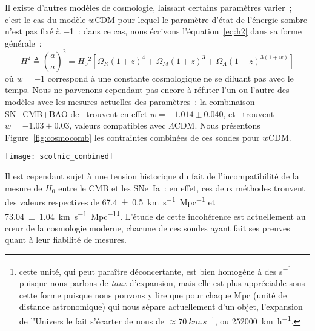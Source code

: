 \documentclass[../main/main.tex]{subfiles}
\begin{document}
Il existe d'autres modèles de cosmologie, laissant certains paramètres varier~;
c'est le cas du modèle $w$CDM pour lequel le paramètre d'état de l'énergie
sombre n'est pas fixé à \num{-1}~: dans ce cas, nous écrivons
l'équation~\ref{eq:h2} dans sa forme générale~:
\begin{equation}\label{eq:h2w}
    H^2 \triangleq \left( \frac{\dot{a}}{a} \right)^2 =
    H_0{}^2 \left[ \Omega_R \left( 1+z \right)^4 +
        \Omega_M \left( 1+z \right)^3 +
    \Omega_\Lambda \left( 1+z \right)^{3(1+w)} \right]
\end{equation}
où $w=-1$ correspond à une constante cosmologique ne se diluant pas avec le
temps. Nous ne parvenons cependant pas encore à réfuter l'un ou l'autre des
modèles avec les mesures actuelles des paramètres~: la combinaison SN+CMB+BAO
de~\cite{scolnic2018} trouvent en effet $w = \num{-1.014}\pm\num{0.040}$,
et~\cite{planck2018} trouvent $w = \num{-1.03}\pm\num{0.03}$, valeurs
compatibles avec $\Lambda$CDM. Nous présentons Figure~\ref{fig:cosmocomb} les
contraintes combinées de ces sondes pour $w$CDM.

\begin{SCfigure}[1][ht]
    \centering
    \texttt{[image: scolnic\_combined]}
    \caption[Contraintes sur les paramètres cosmologiques $w$ et $\Omega_M$ par
    la combinaison SNe~Ia, CMB et BAO]{Contraintes à 68 et 95\% sur les
        paramètres cosmologiques $w$ et $\Omega_M$ par la combinaison SNe~Ia
        (\textit{en rouge}), par le CMB (\textit{en bleu}) fournies par la
        collaboration~\cite{planck2015}. Les contours \textit{jaunes} combinent
        le CMB et le BAO~\citep{alam2015}~; les contours \textit{noirs} le CMB
    et les SNe~Ia. Figure de~\cite{scolnic2018}.}\label{fig:cosmocomb}
\end{SCfigure}

Il est cependant sujet à une tension historique du fait de l'incompatibilité de
la mesure de $H_0$ entre le CMB et les SNe~Ia~: en effet, ces deux méthodes
trouvent des valeurs respectives de \SI{67.4\pm0.5}{km.s^{-1}.Mpc^{-1}} et
\SI{73.04\pm1.04}{km.s^{-1}.Mpc^{-1}}\footnote{cette unité, qui peut paraître
    déconcertante, est bien homogène à des \si{s^{-1}} puisque nous parlons de
    \textit{taux} d'expansion, mais elle est plus appréciable sous cette forme
    puisque nous pouvons y lire que pour chaque \si{Mpc} (unité de distance
    astronomique) qui nous sépare actuellement d'un objet, l'expansion de
    l'Univers le fait s'écarter de nous de $\approx \SI{70}{km.s^{-1}}$, ou
\SI{252000}{km.h^{-1}}.}. L'étude de cette incohérence est actuellement au
cœur de la cosmologie moderne, chacune de ces sondes ayant fait ses preuves
quant à leur fiabilité de mesures.
\end{document}
